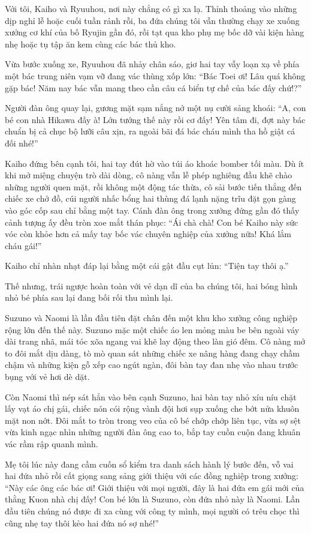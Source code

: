 \documentclass[../main.tex]{subfiles}
\begin{document}
Với tôi, Kaiho và Ryuuhou, nơi này chẳng có gì xa lạ. Thỉnh thoảng vào những dịp nghỉ lễ hoặc cuối tuần rảnh rỗi, ba đứa chúng tôi vẫn thường chạy xe xuống xưởng cơ khí của bố Ryujin gần đó, rồi tạt qua kho phụ mẹ bốc dỡ vài kiện hàng nhẹ hoặc tụ tập ăn kem cùng các bác thủ kho.

Vừa bước xuống xe, Ryuuhou đã nhảy chân sáo, giơ hai tay vẫy loạn xạ về phía một bác trung niên vạm vỡ đang vác thùng xốp lớn: ``Bác Toei ơi! Lâu quá không gặp bác! Năm nay bác vẫn mang theo cần câu cá biển tự chế của bác đấy chứ!?''

Người đàn ông quay lại, gương mặt sạm nắng nở một nụ cười sảng khoái: ``A, con bé con nhà Hikawa đấy à! Lớn tướng thế này rồi cơ đấy! Yên tâm đi, đợt này bác chuẩn bị cả chục bộ lưỡi câu xịn, ra ngoài bãi đá bác cháu mình tha hồ giật cá đối nhé!''

Kaiho đứng bên cạnh tôi, hai tay đút hờ vào túi áo khoác bomber tối màu. Dù ít khi mở miệng chuyện trò dài dòng, cô nàng vẫn lễ phép nghiêng đầu khẽ chào những người quen mặt, rồi không một động tác thừa, cô sải bước tiến thẳng đến chiếc xe chở đồ, cúi người nhấc bổng hai thùng đá lạnh nặng trĩu đặt gọn gàng vào góc cốp sau chỉ bằng một tay. Cánh đàn ông trong xưởng đứng gần đó thấy cảnh tượng ấy đều tròn xoe mắt thán phục: ``Ái chà chà! Con bé Kaiho này sức vóc còn khỏe hơn cả mấy tay bốc vác chuyên nghiệp của xưởng nữa! Khá lắm cháu gái!''

Kaiho chỉ nhàn nhạt đáp lại bằng một cái gật đầu cụt lủn: ``Tiện tay thôi ạ.''

Thế nhưng, trái ngược hoàn toàn với vẻ dạn dĩ của ba chúng tôi, hai bóng hình nhỏ bé phía sau lại đang bối rối thu mình lại.

Suzuno và Naomi là lần đầu tiên đặt chân đến một khu kho xưởng công nghiệp rộng lớn đến thế này. Suzuno mặc một chiếc áo len mỏng màu be bên ngoài váy dài trang nhã, mái tóc xõa ngang vai khẽ lay động theo làn gió đêm. Cô nàng mở to đôi mắt dịu dàng, tò mò quan sát những chiếc xe nâng hàng đang chạy chầm chậm và những kiện gỗ xếp cao ngút ngàn, đôi bàn tay đan nhẹ vào nhau trước bụng với vẻ hơi dè dặt.

Còn Naomi thì nép sát hẳn vào bên cạnh Suzuno, hai bàn tay nhỏ xíu níu chặt lấy vạt áo chị gái, chiếc nón cói rộng vành đội hơi sụp xuống che bớt nửa khuôn mặt non nớt. Đôi mắt to tròn trong veo của cô bé chớp chớp liên tục, vừa sợ sệt vừa kinh ngạc nhìn những người đàn ông cao to, bắp tay cuồn cuộn đang khuân vác rầm rập quanh mình.

Mẹ tôi lúc này đang cầm cuốn sổ kiểm tra danh sách hành lý bước đến, vỗ vai hai đứa nhỏ rồi cất giọng sang sảng giới thiệu với các đồng nghiệp trong xưởng: ``Này các ông các bác ơi! Giới thiệu với mọi người, đây là hai đứa em gái mới của thằng Kuon nhà chị đấy! Con bé lớn là Suzuno, còn đứa nhỏ này là Naomi. Lần đầu tiên chúng nó được đi xa cùng với công ty mình, mọi người có trêu chọc thì cũng nhẹ tay thôi kẻo hai đứa nó sợ nhé!''
\end{document}
